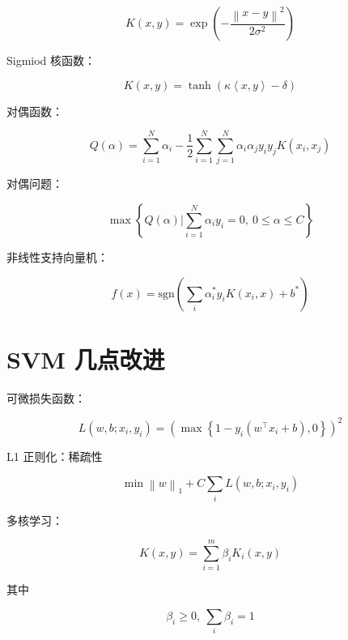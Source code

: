 \documentclass[openany,a4paper,12pt]{ctexbook}
\theoremstyle{kaiti}
\theoremstyle{normal}
\begin{document}
\begin{equation}
  K\left(x,y \right)=\exp \left(-\frac{\left\| x-y \right\|^2}{2\sigma^2}\right)
\end{equation}

Sigmiod 核函数：

\begin{equation}
  K\left(x,y \right)=\tanh \left(\kappa \left< x,y \right> -\delta \right)
\end{equation}

对偶函数：

\begin{equation}
  Q\left(\alpha \right)=\sum_{i=1}^{N}\alpha_i-\frac{1}{2}\sum_{i=1}^{N}\sum_{j=1}^{N}\alpha_i\alpha_jy_iy_jK\left(x_i,x_j \right)
\end{equation}

对偶问题：

\begin{equation}
  \max \left\{ Q\left(\alpha \right)|\sum_{i=1}^{N}\alpha_iy_i=0,~0\leqslant \alpha \leqslant C \right\}
\end{equation}

非线性支持向量机：

\begin{equation}
  f(x)=\mathrm{sgn} \left(\sum_i\alpha_{i}^{*}y_iK\left(x_i,x \right)+b^* \right)
\end{equation}

\section{SVM 几点改进}

可微损失函数：

\begin{equation}
  L\left(w,b;x_i,y_i \right)=\left(\max \left\{ 1-y_i\left(w^{\top}x_i+b \right),0 \right\}\right)^2
\end{equation}

L1 正则化：稀疏性

\begin{equation}
  \min \left\| w \right\|_1+C\sum_iL\left(w,b;x_i,y_i \right)
\end{equation}

多核学习：

\begin{equation}
  K\left(x,y \right)=\sum_{i=1}^{m}\beta_iK_i\left(x,y \right)
\end{equation}

其中

\begin{equation}
  \beta_i\geqslant 0,~\sum_i\beta_i=1
\end{equation}
\end{document}
